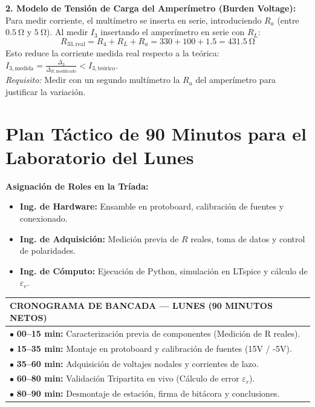 \documentclass[11pt, a4paper]{article}
\begin{document}
\textbf{2. Modelo de Tensión de Carga del Amperímetro (Burden Voltage):}
Para medir corriente, el multímetro se inserta en serie, introduciendo $R_a$ (entre $\qty{0.5}{\ohm}$ y $\qty{5}{\ohm}$). Al medir $I_3$ insertando el amperímetro en serie con $R_L$:
\begin{equation}
    R_{33,\text{real}} = R_4 + R_L + R_a = 330 + 100 + 1.5 = \qty{431.5}{\ohm}
\end{equation}
Esto reduce la corriente medida real respecto a la teórica: $I_{3,\text{medida}} = \frac{\Delta_3}{\Delta_{R,\text{modificado}}} < I_{3,\text{teórico}}$. \\
\textit{Requisito:} Medir con un segundo multímetro la $R_a$ del amperímetro para justificar la variación.

\section{Plan Táctico de 90 Minutos para el Laboratorio del Lunes}
\textbf{Asignación de Roles en la Tríada:}
\begin{itemize}[itemsep=1pt]
    \item \textbf{Ing. de Hardware:} Ensamble en protoboard, calibración de fuentes y conexionado.
    \item \textbf{Ing. de Adquisición:} Medición previa de $R$ reales, toma de datos y control de polaridades.
    \item \textbf{Ing. de Cómputo:} Ejecución de Python, simulación en LTspice y cálculo de $\varepsilon_r$.
\end{itemize}

\begin{center}
    \begin{tabular}{|p{}|}
        \hline
        \cellcolor{gray!10} \textbf{CRONOGRAMA DE BANCADA — LUNES (90 MINUTOS NETOS)} \\
        \hline
        $\bullet$ \textbf{00--15 min:} Caracterización previa de componentes (Medición de R reales). \\
        $\bullet$ \textbf{15--35 min:} Montaje en protoboard y calibración de fuentes (15V / -5V). \\
        $\bullet$ \textbf{35--60 min:} Adquisición de voltajes nodales y corrientes de lazo. \\
        $\bullet$ \textbf{60--80 min:} Validación Tripartita en vivo (Cálculo de error $\varepsilon_r$). \\
        $\bullet$ \textbf{80--90 min:} Desmontaje de estación, firma de bitácora y conclusiones. \\
        \hline
    \end{tabular}
\end{center}
\end{document}
